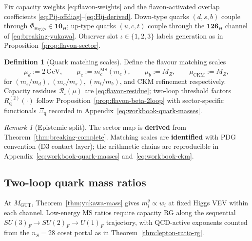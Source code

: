 \documentclass[11pt]{article}
\theoremstyle{plain}
\theoremstyle{definition}
\newtheorem{definition}[theorem]{Definition}
\theoremstyle{remark}
\newtheorem{remark}[theorem]{Remark}
\numberwithin{equation}{section}
\begin{document}
Fix capacity weights \eqref{eq:flavon-weights} and the flavon-activated
overlap coefficients \eqref{eq:Pij-offdiag}--\eqref{eq:Hij-derived}.
Down-type quarks $(d,s,b)$ couple through $\Phi_{\mathrm{Higgs}}\in\mathbf{10}_H$;
up-type quarks $(u,c,t)$ couple through the $\mathbf{126}_H$ channel of
\eqref{eq:breaking-yukawa}. Observer slot $\iota\in\{1,2,3\}$ labels
generation as in Proposition~\ref{prop:flavon-sector}.

\begin{definition}[Quark matching scales]\label{def:quark-matching}
Define the flavour matching scales
\begin{equation}\label{eq:quark-matching}
  \mu_d := 2\,\mathrm{GeV},
  \qquad
  \mu_c := m_c^{\overline{\mathrm{MS}}}(m_c),
  \qquad
  \mu_b := M_Z,
  \qquad
  \mu_{\mathrm{CKM}} := M_Z,
\end{equation}
for $(m_s/m_d)$, $(m_c/m_s)$, $(m_t/m_b)$, and CKM refinement respectively.
Capacity residues $\mathcal{R}_\iota(\mu)$ are \eqref{eq:flavon-residue}; two-loop
threshold factors $R_{\mathrm{q}}^{(2)}(\cdot)$ follow
Proposition~\ref{prop:flavon-beta-2loop} with sector-specific functionals
$\Xi_{\mathrm{q}}$ recorded in Appendix~\eqref{eq:workbook-quark-masses}.
\end{definition}

\begin{remark}[Epistemic split]
The sector map is \textbf{derived} from Theorem~\ref{thm:breaking-complete}.
Matching scales are \textbf{identified} with PDG convention (D3 contact layer);
the arithmetic chains are reproducible in
Appendix~\eqref{eq:workbook-quark-masses} and~\eqref{eq:workbook-ckm}.
\end{remark}

\subsection{Two-loop quark mass ratios}
\label{sec:quark-precision:masses}

At $M_{\mathrm{GUT}}$, Theorem~\ref{thm:yukawa-mass} gives
$m_i^q\propto w_i$ at fixed Higgs VEV within each channel.
Low-energy $\overline{\mathrm{MS}}$ ratios require capacity RG along the
sequential $SU(3)_F\to SU(2)_F\to U(1)_F$ trajectory, with QCD-active
exponents counted from the $n_S=28$ coset portal as in
Theorem~\ref{thm:lepton-ratio-rg}.
\end{document}

